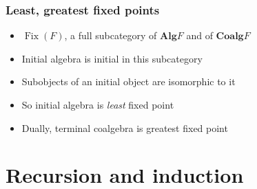 \documentclass{beamer}
\begin{document}
\begin{frame}
  \frametitle{Least, greatest fixed points}
  \begin{itemize}[<+->]
    \item $\operatorname{Fix}(F)$, a full subcategory of $\mathbf{Alg} F$ and of $\mathbf{Coalg} F$
    \item Initial algebra is initial in this subcategory
    \item Subobjects of an initial object are isomorphic to it
    \item So initial algebra is \emph{least} fixed point
    \item Dually, terminal coalgebra is greatest fixed point
  \end{itemize}
\end{frame}
\section{Recursion and induction}
\end{document}
